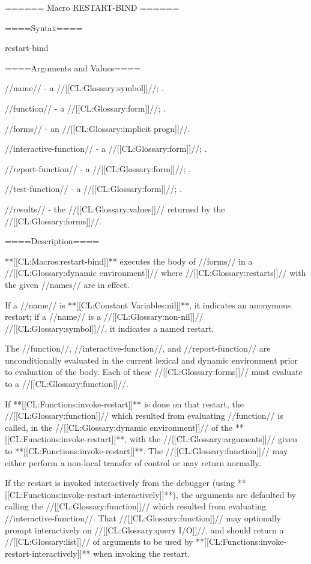 ====== Macro RESTART-BIND ======

====Syntax====

\DefmacWithValuesNewline restart-bind { } {}


====Arguments and Values====

//name// - a //[[CL:Glossary:symbol]]//; \noeval.

//function// - a //[[CL:Glossary:form]]//; \eval.

//forms// - an //[[CL:Glossary:implicit progn]]//.

//interactive-function// - a //[[CL:Glossary:form]]//; \eval.

//report-function// - a //[[CL:Glossary:form]]//; \eval.

//test-function// - a //[[CL:Glossary:form]]//; \eval.

//results// - the //[[CL:Glossary:values]]// returned by the //[[CL:Glossary:forms]]//.

====Description====

**[[CL:Macros:restart-bind]]** executes the body of //forms// in a //[[CL:Glossary:dynamic environment]]// where //[[CL:Glossary:restarts]]// with the given //names// are in effect.

If a //name// is **[[CL:Constant Variables:nil]]**, it indicates an anonymous restart; if a //name// is a //[[CL:Glossary:non-nil]]// //[[CL:Glossary:symbol]]//, it indicates a named restart.

The //function//, //interactive-function//, and //report-function// are unconditionally evaluated in the current lexical and dynamic environment prior to evaluation of the body. Each of these //[[CL:Glossary:forms]]// must evaluate to a //[[CL:Glossary:function]]//.

If **[[CL:Functions:invoke-restart]]** is done on that restart, the //[[CL:Glossary:function]]// which resulted from evaluating //function// is called, in the //[[CL:Glossary:dynamic environment]]// of the **[[CL:Functions:invoke-restart]]**, with the //[[CL:Glossary:arguments]]// given to **[[CL:Functions:invoke-restart]]**. The //[[CL:Glossary:function]]// may either perform a non-local transfer of control or may return normally.

If the restart is invoked interactively from the debugger (using **[[CL:Functions:invoke-restart-interactively]]**), the arguments are defaulted by calling the //[[CL:Glossary:function]]// which resulted from evaluating //interactive-function//. That //[[CL:Glossary:function]]// may optionally prompt interactively on //[[CL:Glossary:query I/O]]//, and should return a //[[CL:Glossary:list]]// of arguments to be used by **[[CL:Functions:invoke-restart-interactively]]** when invoking the restart.

